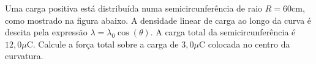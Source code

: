 \documentclass[a4paper,12pt, leqno, answers]{exam}
\begin{document}
\begin{questions}
\begin{parts}
\begin{solution}
    \end{solution}
  \end{parts}

  \question Uma carga positiva est\'{a} distribu\'{i}da numa
  semicircunfer\^{e}ncia de raio $R=60$cm, como mostrado na figura abaixo. A
  densidade linear de carga ao longo da curva \'{e} descita pela express\~{a}o
  $\lambda = \lambda_0 \cos(\theta)$. A carga total da semicircunfer\^{e}ncia
  \'{e} $12,0\mu$C. Calcule a for\c{c}a total sobre a carga de $3,0\mu$C
  colocada no centro da curvatura.
  \begin{center}
  \end{center}
  \begin{solution}
    
  \end{solution}
\end{questions}
\end{document}
